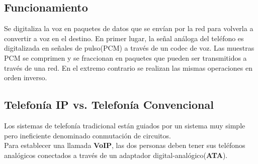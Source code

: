 \documentclass[a4paper, 11pt]{article} %
\begin{document}
	\subsection{Funcionamiento}
	Se digitaliza la voz en paquetes de datos que se envían por la red para volverla a convertir a voz en el destino. En primer lugar, la señal análoga del teléfono es digitalizada en señales de pulso(PCM) a través de un codec de voz. 
	Las muestras PCM se comprimen y se fraccionan en paquetes que pueden ser transmitidos a través de una red. En el extremo contrario se realizan las mismas operaciones en orden inverso.
	
	\subsection{Telefonía IP vs. Telefonía Convencional}
		Los sistemas de telefonía tradicional están guiados por un sistema muy simple pero ineficiente denominado conmutación de circuitos.\\
		Para establecer una llamada \textbf{VoIP}, las dos personas deben tener sus teléfonos analógicos conectados a través de un adaptador digital-analógico(\textbf{ATA}).\\
\end{document}
